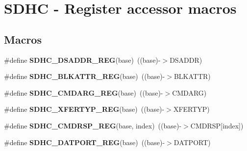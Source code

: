 \hypertarget{group__SDHC__Register__Accessor__Macros}{}\section{S\+D\+HC -\/ Register accessor macros}
\label{group__SDHC__Register__Accessor__Macros}
\subsection*{Macros}
\begin{DoxyCompactItemize}
\item 
\#define {\bfseries S\+D\+H\+C\+\_\+\+D\+S\+A\+D\+D\+R\+\_\+\+R\+EG}(base)~((base)-\/$>$D\+S\+A\+D\+DR)\hypertarget{group__SDHC__Register__Accessor__Macros_ga1cc560682c121f05e541df1777abbd4c}{}\label{group__SDHC__Register__Accessor__Macros_ga1cc560682c121f05e541df1777abbd4c}

\item 
\#define {\bfseries S\+D\+H\+C\+\_\+\+B\+L\+K\+A\+T\+T\+R\+\_\+\+R\+EG}(base)~((base)-\/$>$B\+L\+K\+A\+T\+TR)\hypertarget{group__SDHC__Register__Accessor__Macros_ga8133bf575b6792e05d833efe2aa39e2c}{}\label{group__SDHC__Register__Accessor__Macros_ga8133bf575b6792e05d833efe2aa39e2c}

\item 
\#define {\bfseries S\+D\+H\+C\+\_\+\+C\+M\+D\+A\+R\+G\+\_\+\+R\+EG}(base)~((base)-\/$>$C\+M\+D\+A\+RG)\hypertarget{group__SDHC__Register__Accessor__Macros_ga4c4e15d1df4b9fa8f887cea053ecde62}{}\label{group__SDHC__Register__Accessor__Macros_ga4c4e15d1df4b9fa8f887cea053ecde62}

\item 
\#define {\bfseries S\+D\+H\+C\+\_\+\+X\+F\+E\+R\+T\+Y\+P\+\_\+\+R\+EG}(base)~((base)-\/$>$X\+F\+E\+R\+T\+YP)\hypertarget{group__SDHC__Register__Accessor__Macros_ga5299ec205ad7aa587b9df4c3a0d0d7de}{}\label{group__SDHC__Register__Accessor__Macros_ga5299ec205ad7aa587b9df4c3a0d0d7de}

\item 
\#define {\bfseries S\+D\+H\+C\+\_\+\+C\+M\+D\+R\+S\+P\+\_\+\+R\+EG}(base,  index)~((base)-\/$>$C\+M\+D\+R\+SP\mbox{[}index\mbox{]})\hypertarget{group__SDHC__Register__Accessor__Macros_ga2211777fea01d3b20cef3e52b29f41cf}{}\label{group__SDHC__Register__Accessor__Macros_ga2211777fea01d3b20cef3e52b29f41cf}

\item 
\#define {\bfseries S\+D\+H\+C\+\_\+\+D\+A\+T\+P\+O\+R\+T\+\_\+\+R\+EG}(base)~((base)-\/$>$D\+A\+T\+P\+O\+RT)\hypertarget{group__SDHC__Register__Accessor__Macros_ga640fff35a27e3710eacdd3ffe152e65c}{}\label{group__SDHC__Register__Accessor__Macros_ga640fff35a27e3710eacdd3ffe152e65c}


\end{DoxyCompactItemize}
